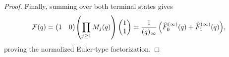 \documentclass[10pt,a4paper]{amsart}
\begin{document}
\begin{proof}
 
Finally, summing over both terminal states gives
\[
\mathcal{F}(q)
=
\begin{pmatrix}1&0\end{pmatrix}
\!\left(\prod_{j\ge1} M_j(q)\right)
\begin{pmatrix}1\\1\end{pmatrix}
=
\frac{1}{(q)_\infty}\,
\Bigl(\widehat{F}_0^{(\infty)}(q)+\widehat{F}_1^{(\infty)}(q)\Bigr),
\]
proving the normalized Euler-type factorization.
\end{proof}
\end{document}
